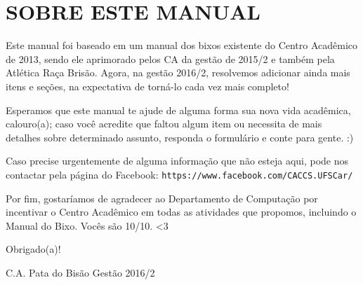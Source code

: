 \section{SOBRE ESTE MANUAL}
Este manual foi baseado em um manual dos bixos existente do Centro Acadêmico de 2013, sendo ele aprimorado pelos CA da gestão de 2015/2 e também pela Atlética Raça Brisão. Agora, na gestão 2016/2, resolvemos adicionar ainda mais itens e seções, na expectativa de torná-lo cada vez mais completo!

Esperamos que este manual te ajude de alguma forma sua nova vida acadêmica, calouro(a); caso você acredite que faltou algum item ou necessita de mais detalhes sobre determinado assunto, responda o formulário e conte para gente. :)

Caso precise urgentemente de alguma informação que não esteja aqui, pode nos contactar pela página do Facebook: \texttt{https://www.facebook.com/CACCS.UFSCar/}

Por fim, gostaríamos de agradecer ao Departamento de Computação por incentivar o Centro Acadêmico em todas as atividades que propomos, incluindo o Manual do Bixo. Vocês são 10/10. <3

\begin{flushright}
  Obrigado(a)!

  C.A. Pata do Bisão Gestão 2016/2
\end{flushright}
